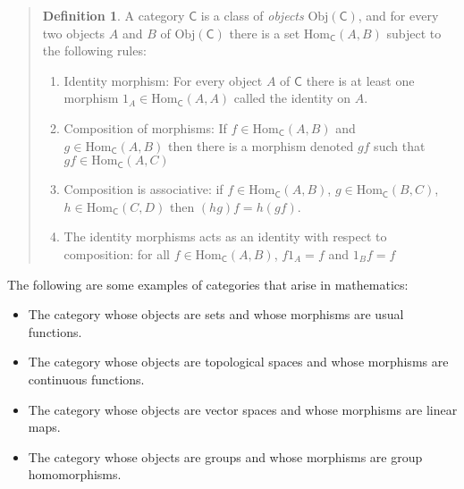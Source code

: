 \documentclass[11pt]{article}
\newcommand{\C}{\mathsf{C}}
\newcommand{\Obj}{\text{Obj}}
\newcommand{\Hom}[2]{\text{Hom}_{#1}(#2)}
\theoremstyle{definition}
\newtheorem{definition}{Definition}
\begin{document}
\begin{quote}
\begin{definition}
A category $\C$ is a class of \textit{objects} $\Obj(\C)$, and for every two objects $A$ and $B$ of $\Obj(\C)$ there is a set $\Hom{\C}{A,B}$ subject to the following rules:

\begin{enumerate}
    \item Identity morphism: For every object $A$ of $\C$ there is at least one morphism $1_A \in \Hom{\C}{A,A}$ called the identity on $A$.
    \item Composition of morphisms: If $f \in \Hom{\C}{A,B}$ and $g \in \Hom{\C}{A,B}$ then there is a morphism denoted $gf$ such that $gf \in \Hom{\C}{A,C}$
    \item Composition is associative: if $f \in \Hom{\C}{A,B}$, $g \in \Hom{\C}{B,C}$, $h \in \Hom{\C}{C,D}$ then $(hg)f = h(gf)$.
    \item The identity morphisms acts as an identity with respect to composition: for all $f \in \Hom{\C}{A,B}$, $f1_A =f$ and $1_Bf=f$
\end{enumerate}
\end{definition}

\end{quote}

The following are some examples of categories that arise in mathematics:

\begin{itemize}
    \item The category whose objects are sets and whose morphisms are usual functions.
    \item The category whose objects are topological spaces and whose morphisms are continuous functions.
    \item The category whose objects are vector spaces and whose morphisms are linear maps.
    \item The category whose objects are groups and whose morphisms are group homomorphisms.
\end{itemize}
\end{document}
